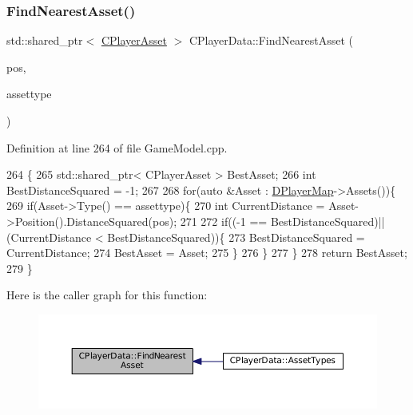 \hypertarget{classCPlayerData_a5f70ad16e9b4e8aa9edc6e8fc4136527}{}\label{classCPlayerData_a5f70ad16e9b4e8aa9edc6e8fc4136527} 
\subsubsection{\texorpdfstring{Find\+Nearest\+Asset()}{FindNearestAsset()}}
{\footnotesize\ttfamily std\+::shared\+\_\+ptr$<$ \hyperlink{classCPlayerAsset}{C\+Player\+Asset} $>$ C\+Player\+Data\+::\+Find\+Nearest\+Asset (\begin{DoxyParamCaption}\item[{const \hyperlink{classCPosition}{C\+Position} \&}]{pos,  }\item[{\hyperlink{GameDataTypes_8h_a5600d4fc433b83300308921974477fec}{E\+Asset\+Type}}]{assettype }\end{DoxyParamCaption})}



Definition at line 264 of file Game\+Model.\+cpp.


\begin{DoxyCode}
264                                                                                                      \{
265     std::shared\_ptr< CPlayerAsset > BestAsset;
266     \textcolor{keywordtype}{int} BestDistanceSquared = -1;
267 
268     \textcolor{keywordflow}{for}(\textcolor{keyword}{auto} &Asset : \hyperlink{classCPlayerData_a452163191cd4603e1e38dd8d4bb9691c}{DPlayerMap}->Assets())\{
269         \textcolor{keywordflow}{if}(Asset->Type() == assettype)\{
270             \textcolor{keywordtype}{int} CurrentDistance = Asset->Position().DistanceSquared(pos);
271             
272             \textcolor{keywordflow}{if}((-1 == BestDistanceSquared)||(CurrentDistance < BestDistanceSquared))\{
273                 BestDistanceSquared = CurrentDistance;
274                 BestAsset = Asset;
275             \}
276         \}
277     \}
278     \textcolor{keywordflow}{return} BestAsset;
279 \}
\end{DoxyCode}
Here is the caller graph for this function\+:\nopagebreak
\begin{figure}[H]
\begin{center}
\leavevmode
\includegraphics[width=350pt]{classCPlayerData_a5f70ad16e9b4e8aa9edc6e8fc4136527_icgraph}
\end{center}
\end{figure}
\hypertarget{classCPlayerData_a5f0a1280933f7bb9a65ab256ecff1a69}{}\label{classCPlayerData_a5f0a1280933f7bb9a65ab256ecff1a69} 

